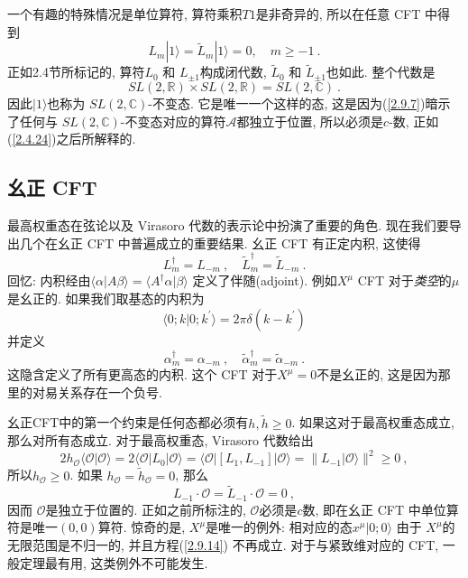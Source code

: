 一个有趣的特殊情况是单位算符, 算符乘积$T1$是非奇异的, 所以在任意 CFT 中得到
\begin{equation}
L_{m}|1\rangle=\tilde{L}_{m}|1\rangle=0, \quad m \geq-1 \:. \label{2.9.9}
\end{equation}
正如2.4节所标记的, 算符$L_{0}$ 和 $L_{\pm 1}$构成闭代数, $\tilde{L}_{0}$ 和 $\tilde{L}_{\pm 1}$也如此. 整个代数是
\begin{equation}
SL(2,\mathds{R})\times SL(2,\mathds{R})= S L(2, \mathds{C}) \:. \label{2.9.10}
\end{equation}
因此$|1\rangle$也称为 $SL(2, \mathds{C})$-不变态. 它是唯一一个这样的态, 这是因为(\ref{2.9.7})暗示了任何与 $SL(2, \mathds{C})$-不变态对应的算符$\mathscr{A}$都独立于位置, 所以必须是$c$-数, 正如(\ref{2.4.24})之后所解释的. 

\subsection*{幺正 CFT}

最高权重态在弦论以及 Virasoro 代数的表示论中扮演了重要的角色. 现在我们要导出几个在幺正 CFT 中普遍成立的重要结果. 幺正 CFT 有正定内积, 这使得
\begin{equation}
L_{m}^{\dagger}=L_{-m} \: , \quad \tilde{L}_{m}^{\dagger}=\tilde{L}_{-m} \:. \label{2.9.11}
\end{equation}
回忆: 内积经由$\langle\alpha \vert A \beta\rangle=\langle A^{\dagger} \alpha \vert \beta\rangle$ 定义了伴随(adjoint). 
例如$X^\mu$ CFT 对于\emph{类空}的$\mu$是幺正的. 如果我们取基态的内积为
\begin{equation}
\langle 0 ; k \vert 0 ; k^{\prime} \rangle=2 \pi \delta(k-k^{\prime})  \label{2.9.12}
\end{equation} 
并定义
\begin{equation}
\alpha_{m}^{\dagger}=\alpha_{-m} \:, \quad \tilde{\alpha}_{m}^{\dagger}=\tilde{\alpha}_{-m} \:. \label{2.9.13}
\end{equation}
这隐含定义了所有更高态的内积. 这个 CFT 对于$X^\mu=0$不是幺正的, 这是因为那里的对易关系存在一个负号. 

幺正CFT中的第一个约束是任何态都必须有$h, \tilde{h} \geq 0$. 如果这对于最高权重态成立, 那么对所有态成立. 对于最高权重态, Virasoro 代数给出
\begin{equation}\label{2.9.14}
2 h_{\mathcal{O}}\langle\mathcal{O} \vert \mathcal{O}\rangle=2\langle\mathcal{O}\vert L_{0}\vert \mathcal{O}\rangle=\langle\mathcal{O}|[L_{1}, L_{-1}]|\mathcal{O}\rangle=\| L_{-1}|\mathcal{O}\rangle \|^{2} \geq 0 \:,
\end{equation}
所以$h_{\mathcal{O}} \geq 0 $. 如果 $h_{\mathcal{O}}=\tilde{h}_{\mathcal{O}}=0$, 那么
\begin{equation}
L_{-1} \cdot \mathcal{O}=\tilde{L}_{-1} \cdot \mathcal{O}=0 \:, \label{2.9.15}
\end{equation}
因而 $\mathcal{O}$是独立于位置的. 正如之前所标注的, $\mathcal{O}$必须是$c$数, 即在幺正 CFT 中单位算符是唯一$(0,0)$算符. 惊奇的是, $X^\mu$是唯一的例外: 相对应的态$x^{\mu}|0 ; 0\rangle$ 由于 $X^\mu$的无限范围是不归一的, 并且方程(\ref{2.9.14}) 不再成立. 
对于与紧致维对应的 CFT, 一般定理最有用, 这类例外不可能发生.

